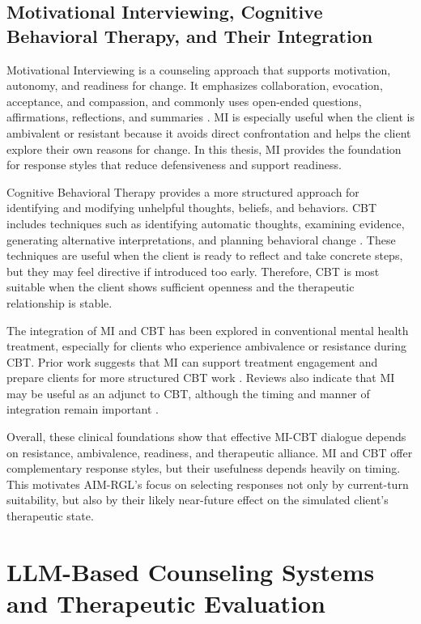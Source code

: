 \subsection{Motivational Interviewing, Cognitive Behavioral Therapy, and Their Integration}

Motivational Interviewing is a counseling approach that supports motivation, autonomy, and readiness for change. It emphasizes collaboration, evocation, acceptance, and compassion, and commonly uses open-ended questions, affirmations, reflections, and summaries \cite{miller2013motivational,bischof2021motivational}. MI is especially useful when the client is ambivalent or resistant because it avoids direct confrontation and helps the client explore their own reasons for change. In this thesis, MI provides the foundation for response styles that reduce defensiveness and support readiness.

Cognitive Behavioral Therapy provides a more structured approach for identifying and modifying unhelpful thoughts, beliefs, and behaviors. CBT includes techniques such as identifying automatic thoughts, examining evidence, generating alternative interpretations, and planning behavioral change \cite{beck2020cognitive,chand2023cognitive}. These techniques are useful when the client is ready to reflect and take concrete steps, but they may feel directive if introduced too early. Therefore, CBT is most suitable when the client shows sufficient openness and the therapeutic relationship is stable.

The integration of MI and CBT has been explored in conventional mental health treatment, especially for clients who experience ambivalence or resistance during CBT. Prior work suggests that MI can support treatment engagement and prepare clients for more structured CBT work \cite{arkowitz2004integrating,westra2009adding,westra2016integrating}. Reviews also indicate that MI may be useful as an adjunct to CBT, although the timing and manner of integration remain important \cite{randall2017motivational,marker2018efficacy}.

Overall, these clinical foundations show that effective MI-CBT dialogue depends on resistance, ambivalence, readiness, and therapeutic alliance. MI and CBT offer complementary response styles, but their usefulness depends heavily on timing. This motivates AIM-RGL's focus on selecting responses not only by current-turn suitability, but also by their likely near-future effect on the simulated client's therapeutic state.

\section{LLM-Based Counseling Systems and Therapeutic Evaluation}

